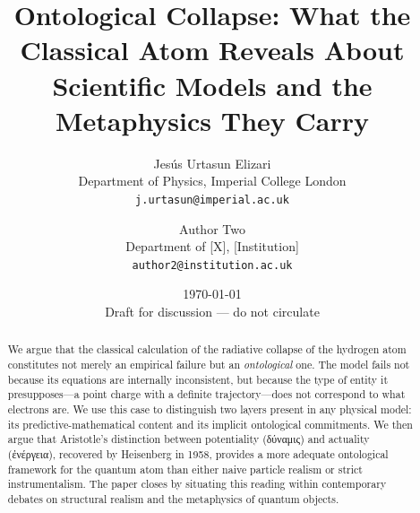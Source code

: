 \documentclass[11pt]{article}
\title{\textbf{Ontological Collapse: What the Classical Atom Reveals
  About Scientific Models and the Metaphysics They Carry}}
\author{
  Jes\'{u}s Urtasun Elizari\\
  \small Department of Physics, Imperial College London\\
  \small \texttt{j.urtasun@imperial.ac.uk}
  \and
  Author Two\\
  \small Department of [X], [Institution]\\
  \small \texttt{author2@institution.ac.uk}
}
\date{\today \\ \small Draft for discussion --- do not circulate}
\begin{document}
\maketitle

\begin{abstract}
We argue that the classical calculation of the radiative collapse of the
hydrogen atom constitutes not merely an empirical failure but an
\emph{ontological} one. The model fails not because its equations are
internally inconsistent, but because the type of entity it
presupposes---a point charge with a definite trajectory---does not
correspond to what electrons are. We use this case to distinguish two
layers present in any physical model: its predictive-mathematical
content and its implicit ontological commitments. We then argue that
Aristotle's distinction between potentiality (\textgreek{δύναμις}) and
actuality (\textgreek{ἐνέργεια}), recovered by Heisenberg in 1958,
provides a more adequate ontological framework for the quantum atom than
either naive particle realism or strict instrumentalism. The paper
closes by situating this reading within contemporary debates on
structural realism and the metaphysics of quantum objects.
\end{abstract}









\end{document}
